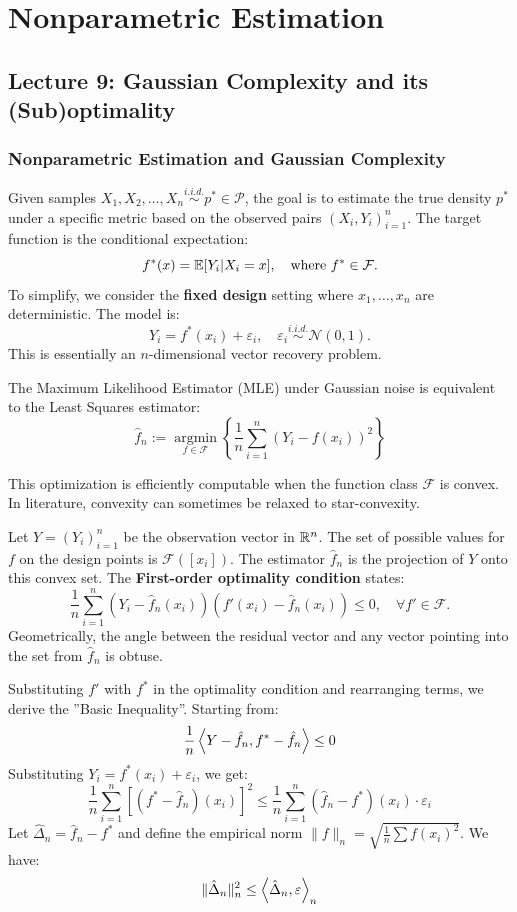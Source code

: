 \chapter{Nonparametric Estimation}
\section{Lecture 9: Gaussian Complexity and its (Sub)optimality}
\subsection{Nonparametric Estimation and Gaussian Complexity}
Given samples $X_1, X_2, \dots, X_n \overset{i.i.d.}{\sim} p^* \in \mathcal{P}$, the goal is to estimate the true density $p^*$ under a specific metric based on the observed pairs $(X_i, Y_i)_{i=1}^n$. The target function is the conditional expectation:
$$ f^*(x) = \mathbb{E}[Y_i | X_i = x], \quad \text{where } f^* \in \mathcal{F}. $$
To simplify, we consider the \textbf{fixed design} setting where $x_1, \dots, x_n$ are deterministic. The model is:
$$ Y_i = f^*(x_i) + \varepsilon_i, \quad \varepsilon_i \overset{i.i.d.}{\sim} \mathcal{N}(0,1). $$
This is essentially an $n$-dimensional vector recovery problem.

The Maximum Likelihood Estimator (MLE) under Gaussian noise is equivalent to the Least Squares estimator:
$$ \hat{f}_n := \operatorname*{argmin}_{f \in \mathcal{F}} \left\{ \frac{1}{n} \sum_{i=1}^n (Y_i - f(x_i))^2 \right\} $$
\begin{remark}
This optimization is efficiently computable when the function class $\mathcal{F}$ is convex. In literature, convexity can sometimes be relaxed to star-convexity.
\end{remark}


Let $Y = (Y_i)_{i=1}^n$ be the observation vector in $\mathbb{R}^n$. The set of possible values for $f$ on the design points is $\mathcal{F}([x_i])$. The estimator $\hat{f}_n$ is the projection of $Y$ onto this convex set. The \textbf{First-order optimality condition} states:
$$ \frac{1}{n} \sum_{i=1}^n (Y_i - \hat{f}_n(x_i)) (f'(x_i) - \hat{f}_n(x_i)) \leq 0, \quad \forall f' \in \mathcal{F}. $$
Geometrically, the angle between the residual vector and any vector pointing into the set from $\hat{f}_n$ is obtuse.

Substituting $f'$ with $f^*$ in the optimality condition and rearranging terms, we derive the ''Basic Inequality''. Starting from:
$$ \frac{1}{n} \left\langle Y - \hat{f}_n, f^* - \hat{f}_n \right\rangle \leq 0 $$
Substituting $Y_i = f^*(x_i) + \varepsilon_i$, we get:
$$ \frac{1}{n} \sum_{i=1}^n \left[ (f^* - \hat{f}_n)(x_i) \right]^2 \leq \frac{1}{n} \sum_{i=1}^n (\hat{f}_n - f^*)(x_i) \cdot \varepsilon_i $$
Let $\hat{\Delta}_n = \hat{f}_n - f^*$ and define the empirical norm $\|f\|_n = \sqrt{\frac{1}{n} \sum f(x_i)^2}$. We have:
$$ \|\hat{\Delta}_n\|_n^2 \leq \left\langle \hat{\Delta}_n, \varepsilon \right\rangle_n $$

